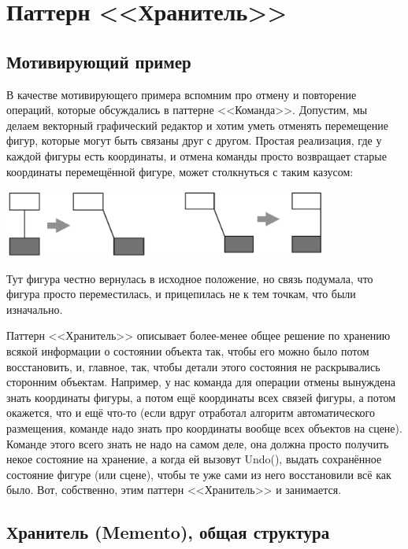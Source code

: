 \documentclass{../../text-style}
\begin{document}
\section{Паттерн <<Хранитель>>}

\subsection{Мотивирующий пример}

В качестве мотивирующего примера вспомним про отмену и повторение операций, которые обсуждались в паттерне <<Команда>>. Допустим, мы делаем векторный графический редактор и хотим уметь отменять перемещение фигур, которые могут быть связаны друг с другом. Простая реализация, где у каждой фигуры есть координаты, и отмена команды просто возвращает старые координаты перемещённой фигуре, может столкнуться с таким казусом:

\begin{center}
    \includegraphics[width=0.8\textwidth]{mementoMotivation.png}
\end{center}

Тут фигура честно вернулась в исходное положение, но связь подумала, что фигура просто переместилась, и прицепилась не к тем точкам, что были изначально.

Паттерн <<Хранитель>> описывает более-менее общее решение по хранению всякой информации о состоянии объекта так, чтобы его можно было потом восстановить, и, главное, так, чтобы детали этого состояния не раскрывались сторонним объектам. Например, у нас команда для операции отмены вынуждена знать координаты фигуры, а потом ещё координаты всех связей фигуры, а потом окажется, что и ещё что-то (если вдруг отработал алгоритм автоматического размещения, команде надо знать про координаты вообще всех объектов на сцене). Команде этого всего знать не надо на самом деле, она должна просто получить некое состояние на хранение, а когда ей вызовут Undo(), выдать сохранённое состояние фигуре (или сцене), чтобы те уже сами из него восстановили всё как было. Вот, собственно, этим паттерн <<Хранитель>> и занимается.

\subsection{Хранитель (Memento), общая структура}
\end{document}
